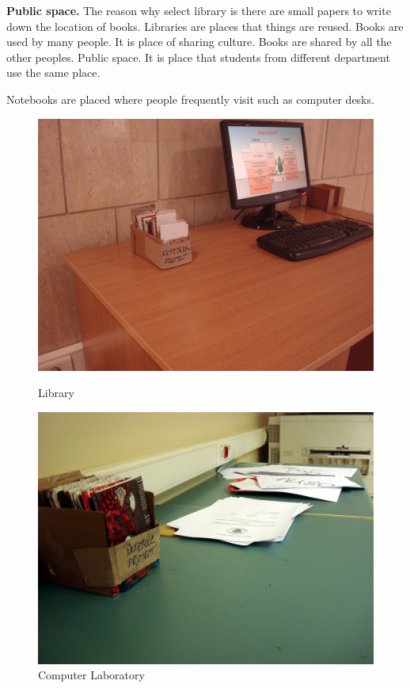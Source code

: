 \textbf{Public space.} The reason why select library is there are small papers to write down the location of books. Libraries are places that things are reused. Books are used by many people. It is place of sharing culture. Books are shared by all the other peoples. Public space. It is place that students from different department use the same place.

Notebooks are placed where people frequently visit such as computer desks.

\begin{figure}[!tbp]
  \begin{minipage}[b]{0.48\textwidth}
    \includegraphics[width=\textwidth]{project_graphics/bilkent1.jpg}
    \caption{Library}
    \label{fig:BilkentLibrary}
  \end{minipage}
  \hfill
  \begin{minipage}[b]{0.48\textwidth}
    \includegraphics[width=\textwidth]{project_graphics/bilkent2.jpg}
    \caption{Computer Laboratory}
    \label{fig:BilkentLaboratory}
  \end{minipage}
\end{figure}

